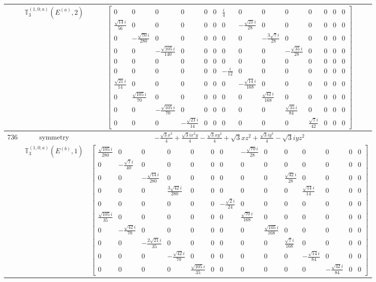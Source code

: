 \documentclass[fleqn,8pt,landscape]{jsarticle}
\begin{document}
\begin{longtable}{ccc}
$  $ & $ \mathbb{T}_{3}^{(1,0;a)}(E^{(a)},2) $ & $ \begin{bmatrix} 0 & 0 & 0 & 0 & 0 & 0 & \frac{i}{4} & 0 & 0 & 0 & 0 & 0 & 0 & 0 \\ \frac{\sqrt{14} i}{56} & 0 & 0 & 0 & 0 & 0 & 0 & - \frac{\sqrt{21} i}{28} & 0 & 0 & 0 & 0 & 0 & 0 \\ 0 & - \frac{\sqrt{70} i}{280} & 0 & 0 & 0 & 0 & 0 & 0 & - \frac{3 \sqrt{7} i}{28} & 0 & 0 & 0 & 0 & 0 \\ 0 & 0 & - \frac{\sqrt{105} i}{140} & 0 & 0 & 0 & 0 & 0 & 0 & - \frac{\sqrt{35} i}{28} & 0 & 0 & 0 & 0 \\ 0 & 0 & 0 & 0 & 0 & 0 & 0 & 0 & 0 & 0 & 0 & 0 & 0 & 0 \\ 0 & 0 & 0 & 0 & 0 & 0 & - \frac{i}{12} & 0 & 0 & 0 & 0 & 0 & 0 & 0 \\ \frac{\sqrt{21} i}{14} & 0 & 0 & 0 & 0 & 0 & 0 & - \frac{\sqrt{14} i}{168} & 0 & 0 & 0 & 0 & 0 & 0 \\ 0 & \frac{\sqrt{105} i}{70} & 0 & 0 & 0 & 0 & 0 & 0 & \frac{\sqrt{42} i}{168} & 0 & 0 & 0 & 0 & 0 \\ 0 & 0 & - \frac{\sqrt{105} i}{70} & 0 & 0 & 0 & 0 & 0 & 0 & \frac{\sqrt{35} i}{84} & 0 & 0 & 0 & 0 \\ 0 & 0 & 0 & - \frac{\sqrt{21} i}{14} & 0 & 0 & 0 & 0 & 0 & 0 & \frac{\sqrt{7} i}{42} & 0 & 0 & 0 \end{bmatrix} $ \\ \hline
$ 736 $ & $ \text{symmetry} $ & $ - \frac{\sqrt{3} x^{3}}{4} + \frac{\sqrt{3} i x^{2} y}{4} - \frac{\sqrt{3} x y^{2}}{4} + \sqrt{3} x z^{2} + \frac{\sqrt{3} i y^{3}}{4} - \sqrt{3} i y z^{2} $ \\
$  $ & $ \mathbb{T}_{3}^{(1,0;a)}(E^{(b)},1) $ & $ \begin{bmatrix} \frac{\sqrt{105} i}{280} & 0 & 0 & 0 & 0 & 0 & 0 & - \frac{\sqrt{70} i}{28} & 0 & 0 & 0 & 0 & 0 & 0 \\ 0 & - \frac{\sqrt{7} i}{40} & 0 & 0 & 0 & 0 & 0 & 0 & 0 & 0 & 0 & 0 & 0 & 0 \\ 0 & 0 & - \frac{\sqrt{14} i}{280} & 0 & 0 & 0 & 0 & 0 & 0 & \frac{\sqrt{42} i}{28} & 0 & 0 & 0 & 0 \\ 0 & 0 & 0 & \frac{3 \sqrt{42} i}{280} & 0 & 0 & 0 & 0 & 0 & 0 & \frac{\sqrt{14} i}{14} & 0 & 0 & 0 \\ 0 & 0 & 0 & 0 & 0 & 0 & - \frac{\sqrt{2} i}{24} & 0 & 0 & 0 & 0 & 0 & 0 & 0 \\ \frac{\sqrt{105} i}{35} & 0 & 0 & 0 & 0 & 0 & 0 & \frac{\sqrt{70} i}{168} & 0 & 0 & 0 & 0 & 0 & 0 \\ 0 & - \frac{\sqrt{42} i}{70} & 0 & 0 & 0 & 0 & 0 & 0 & \frac{\sqrt{105} i}{168} & 0 & 0 & 0 & 0 & 0 \\ 0 & 0 & - \frac{2 \sqrt{21} i}{35} & 0 & 0 & 0 & 0 & 0 & 0 & \frac{\sqrt{7} i}{168} & 0 & 0 & 0 & 0 \\ 0 & 0 & 0 & - \frac{\sqrt{42} i}{70} & 0 & 0 & 0 & 0 & 0 & 0 & - \frac{\sqrt{14} i}{84} & 0 & 0 & 0 \\ 0 & 0 & 0 & 0 & \frac{\sqrt{105} i}{35} & 0 & 0 & 0 & 0 & 0 & 0 & - \frac{\sqrt{42} i}{84} & 0 & 0 \end{bmatrix} $ \\ \hline

\end{longtable}
\end{document}
